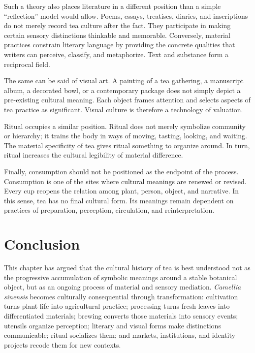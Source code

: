 \documentclass[numbers]{IntechOpen-Book}
\begin{document}
Such a theory also places literature in a different position than a simple ``reflection'' model would allow. Poems, essays, treatises, diaries, and inscriptions do not merely record tea culture after the fact. They participate in making certain sensory distinctions thinkable and memorable. Conversely, material practices constrain literary language by providing the concrete qualities that writers can perceive, classify, and metaphorize. Text and substance form a reciprocal field.

The same can be said of visual art. A painting of a tea gathering, a manuscript album, a decorated bowl, or a contemporary package does not simply depict a pre-existing cultural meaning. Each object frames attention and selects aspects of tea practice as significant. Visual culture is therefore a technology of valuation.

Ritual occupies a similar position. Ritual does not merely symbolize community or hierarchy; it trains the body in ways of moving, tasting, looking, and waiting. The material specificity of tea gives ritual something to organize around. In turn, ritual increases the cultural legibility of material difference.

Finally, consumption should not be positioned as the endpoint of the process. Consumption is one of the sites where cultural meanings are renewed or revised. Every cup reopens the relation among plant, person, object, and narrative. In this sense, tea has no final cultural form. Its meanings remain dependent on practices of preparation, perception, circulation, and reinterpretation.

\section{Conclusion}

This chapter has argued that the cultural history of tea is best understood not as the progressive accumulation of symbolic meanings around a stable botanical object, but as an ongoing process of material and sensory mediation. \textit{Camellia sinensis} becomes culturally consequential through transformation: cultivation turns plant life into agricultural practice; processing turns fresh leaves into differentiated materials; brewing converts those materials into sensory events; utensils organize perception; literary and visual forms make distinctions communicable; ritual socializes them; and markets, institutions, and identity projects recode them for new contexts.
\end{document}
